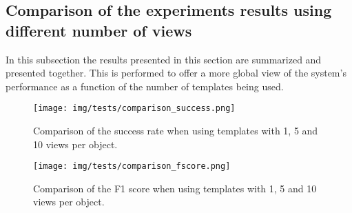 	\subsection{Comparison of the experiments results using different number of views}
	In this subsection the results presented in this section are summarized and presented together. 
	This is performed to offer a more global view of the system's performance as a function of the number of templates being used. 

	\begin{figure}[H]
		\begin{center}
	    \texttt{[image: img/tests/comparison\_success.png]}
		\caption[Comparison of the success rate]{Comparison of the success rate when using templates with 1, 5 and 10 views per object.}
		\label{comparison_success}
		\end{center}
	\end{figure}

	\begin{figure}[H]
		\begin{center}
	    \texttt{[image: img/tests/comparison\_fscore.png]}
		\caption[Comparison of the F1 score]{Comparison of the F1 score when using templates with 1, 5 and 10 views per object.}
		\label{comparison_success}
		\end{center}
	\end{figure}